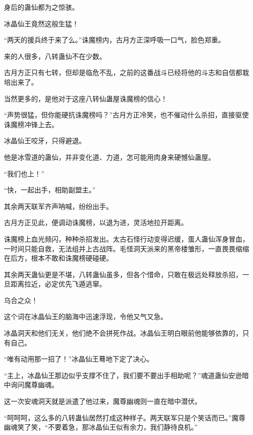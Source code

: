 \begin{this_body}
身后的蛊仙都为之惊骇。

冰晶仙王竟然这般生猛！

“两天的援兵终于来了么。”诛魔榜内，古月方正深呼吸一口气，脸色郑重。

来的人很多，八转蛊仙不在少数。

古月方正只有七转，但却是临危不乱，之前的这番战斗已经将他的斗志和自信都栽培出来了。

当然更多的，是他对于这座八转仙蛊屋诛魔榜的信心！

“声势很猛，但你能硬抗诛魔榜吗？”古月方正冷笑，也不催动什么杀招，直接驱使诛魔榜冲锋上去。

冰晶仙王咬牙，只得避退。

他是冰雪道的蛊仙，并非变化道、力道，怎可能用肉身来硬憾仙蛊屋。

“我们也上！”

“快，一起出手，相助副盟主。”

其余两天联军齐声呐喊，纷纷出手。

古月方正见此，便调动诛魔榜，以退为进，灵活地拉开距离。

诛魔榜上血光频闪，种种杀招发出。太古石怪行动变得迟缓，蛋人蛊仙浑身冒血，一时间只能自救，无法组并上古战阵。毛怪洞天派来的黑帝楼雏形，一直畏畏缩缩在后方，根本不敢和诛魔榜硬碰硬。

其余两天蛊仙更是不堪，八转蛊仙虽多，但各个惜命，只敢在极远处释放杀招，一旦距离拉近，必定优先飞遁逃窜。

乌合之众！

这个词在冰晶仙王的脑海中迅速浮现，令他又气又急。

冰晶洞天和他们无关，他们绝不会拼死作战。冰晶仙王明白眼前他能够依靠的，只有自己。

“唯有动用那一招了！”冰晶仙王蓦地下定了决心。

“主上，冰晶仙王那边似乎支撑不住了，我们要不要出手相助呢？”魂道蛊仙安逊暗中询问魔尊幽魂。

这一次安魂洞天就是派遣了他过来，魔尊幽魂则一直在暗中潜伏。

“呵呵呵，这么多的八转蛊仙居然打成这种样子。两天联军只是个笑话而已。”魔尊幽魂笑了笑，“不要着急，那冰晶仙王似有余力，我们静待良机。”

\end{this_body}

